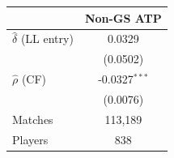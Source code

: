 \begin{tabular}{lc}
\toprule
 & Non-GS ATP \\
\midrule
$\hat{\delta}$ (LL entry) & 0.0329 \\
 & (0.0502) \\
$\hat{\rho}$ (CF) & -0.0327$^{***}$ \\
 & (0.0076) \\
\midrule
Matches & 113,189 \\
Players & 838 \\
\bottomrule
\end{tabular}

